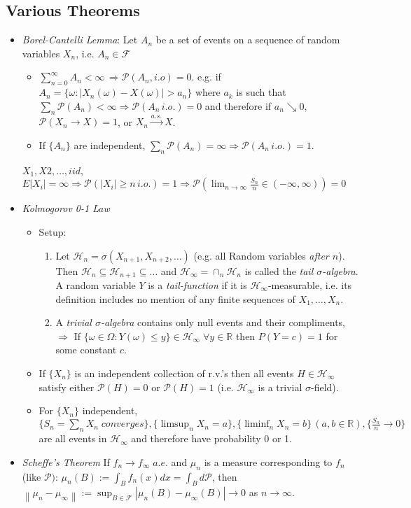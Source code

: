 \documentclass[11pt]{article}
\newcommand{\bbr}{\mathbb{R}}
\renewcommand{\P}{\mathbb{P}}
\newcommand{\fcal}{\mathcal{F}}
\newcommand{\hcal}{\mathcal{H}}
\newcommand{\go}{\omega}
\newcommand{\gs}{\sigma}
\newcommand{\Go}{\Omega}
\newcommand\norm[1]{\left\lVert#1\right\rVert}
\newcommand\abs[1]{\left|#1\right|}
\renewcommand{\to}{\longrightarrow}
\newcommand{\asto}{\overset{a.s.}{\to}}
\renewcommand{\P}{\mathcal{P}}
\newcommand{\gw}{\go}
\newcommand{\imp}{\Rightarrow}
\newcommand{\gm}{\mu}
\begin{document}
\begin{multicols}{2}
\subsection{Various Theorems}
\begin{itemize}
\item \textit{Borel-Cantelli Lemma}:
Let $A_n$ be a set of events on a sequence of random variables $X_n$, i.e. $A_n \in \mathcal{F}$
\begin{itemize}
\item $\sum_{n=0}^\infty A_n <  \infty \, \imp \P(A_n, i.o)=0$. e.g. if $A_n=\{ \gw: \abs{X_n(\gw) -X(\gw)}>a_n\}$ where $a_k$ is such that $\sum_n \P(A_n) <\infty \imp \P(A_n \, i.o.)=0$ and therefore if $a_n \searrow 0$, $\P(X_n \to X)=1$, or $X_n \asto X$.
\item If $\{A_n\}$ are independent, $\sum_{n}\P(A_n) = \infty \imp \P(A_n \, i.o.)=1$.
\end{itemize}
 $X_1,X2,\ldots, iid$, $E\abs{X_i} = \infty \imp \P(\abs{X_i} \geq n \, i.o.)=1 \imp \P(\lim_{n \to \infty} \frac{S_n}{n}\in (-\infty,\infty))=0$
 \item \textit{Kolmogorov 0-1 Law}
 \begin{itemize}
 \item Setup:
 \begin{enumerate}
 \item Let $\mathcal{H}_n = \gs(X_{n+1},X_{n+2},\ldots)$ (e.g. all Random variables \textit{after $n$}).  Then $\hcal_n \subseteq \hcal_{n+1}\subseteq \ldots$ and $\hcal_\infty = \cap_n \hcal_n$ is called the \textit{tail $\gs$-algebra}.  A random variable $Y$ is a \textit{tail-function} if it is $\hcal_\infty$-measurable, i.e. its definition includes no mention of any finite sequences of $X_1,\ldots, X_n$.
 \item A \textit{trivial $\gs$-algebra} contains only null events and their compliments, $\imp$ If $\{ \gw \in \Go: Y(\gw) \leq y\} \in \hcal_\infty \; \forall y \in \bbr$ then $P(Y=c)=1$ for some constant $c$.
 \end{enumerate}
 \item If $\{X_n\}$ is an independent collection of r.v.'s then all events $H \in \hcal_\infty$ satisfy either $\P(H)=0$ or $\P(H)=1$ (i.e. $\hcal_\infty$ is a trivial $\gs$-field).
\item For $\{X_n\}$ independent, $\{S_n=\sum_n X_n \; converges\}, \{\limsup_n X_n = a\}, \{\liminf_n X_n =b\}\, (a,b \in \bbr), \{\frac{S_n}{n}\to 0\}$ are all events in $\hcal_\infty$ and therefore have probability 0 or 1.
 \end{itemize}
\item \textit{Scheffe's Theorem} If $f_n \to f_\infty \;a.e.$ and $\gm_n$ is a measure corresponding to $f_n$ (like $\P)$: $\gm_n (B) := \int_B f_n(x) dx = \int_B d\P$, then $\norm{\gm_n-\gm_\infty}:=\sup_{B \in \fcal} \abs{\gm_n(B)-\gm_\infty(B)} \to 0$ as $n \to \infty$.
\end{itemize}

\end{multicols}
\end{document}
